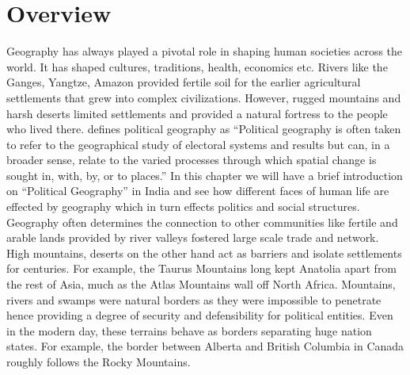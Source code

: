 \section{Overview}
Geography has always played a pivotal role in shaping human societies across the world. It has shaped cultures, traditions, health, economics etc. Rivers like the Ganges, Yangtze, Amazon provided fertile soil for the earlier agricultural settlements that grew into complex civilizations. However, rugged mountains and harsh deserts limited settlements and provided a natural fortress to the people who lived there.  \cite{kitchin2009international} defines political geography as ``Political geography is often taken to refer to the geographical study of electoral systems and results but can, in a broader sense, relate to the varied processes through which spatial change is sought in, with, by, or to places.'' In this chapter we will have a brief introduction on ``Political Geography'' in India and see how different faces of human life are effected by geography which in turn effects politics and social structures. Geography often determines the connection to other communities like fertile and arable lands provided by river valleys fostered large scale trade and network. High mountains, deserts on the other hand act as barriers and isolate settlements for centuries. For example, the Taurus Mountains long kept Anatolia apart from the rest of Asia, much as the Atlas Mountains wall off North Africa. Mountains, rivers and swamps were natural borders as they were impossible to penetrate hence providing a degree of security and defensibility for political entities. Even in the modern day, these terrains behave as borders separating huge nation states. For example, the border between Alberta and British Columbia in Canada roughly follows the Rocky Mountains. 

\vspace{0.3cm}

